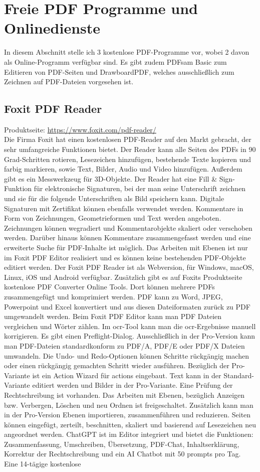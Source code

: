 \section{Freie PDF Programme und Onlinedienste}
In diesem Abschnitt stelle ich 3 kostenlose PDF-Programme vor, wobei 2 davon als Online-Programm verfügbar sind. Es gibt zudem PDFsam Basic zum Editieren von PDF-Seiten und DrawboardPDF, welches ausschließlich zum Zeichnen auf PDF-Dateien vorgesehen ist.

\subsection{Foxit PDF Reader}
Produktseite: \url{https://www.foxit.com/pdf-reader/} \\
Die Firma Foxit hat einen kostenlosen PDF-Reader auf den Markt gebracht, der sehr umfangreiche Funktionen bietet. Der Reader kann alle Seiten des PDFs in 90 Grad-Schritten rotieren, Lesezeichen hinzufügen, bestehende Texte kopieren und farbig markieren, sowie Text, Bilder, Audio und Video hinzufügen. Außerdem gibt es ein Messwerkzeug für 3D-Objekte. Der Reader hat eine Fill \& Sign-Funktion für elektronische Signaturen, bei der man seine Unterschrift zeichnen und sie für die folgende Unterschriften als Bild speichern kann. Digitale Signaturen mit Zertifikat können ebenfalls verwendet werden. Kommentare in Form von Zeichnungen, Geometrieformen und Text werden angeboten. Zeichnungen können wegradiert und Kommentarobjekte skaliert oder verschoben werden. Darüber hinaus können Kommentare zusammengefasst werden und eine erweiterte Suche für PDF-Inhalte ist möglich. Das Arbeiten mit Ebenen ist nur im Foxit PDF Editor realisiert und es können keine bestehenden PDF-Objekte editiert werden. Der Foxit PDF Reader ist als Webversion, für Windows, macOS, Linux, iOS und Android verfügbar. Zusätzlich gibt es auf Foxits Produktseite kostenlose PDF Converter Online Tools. Dort können mehrere PDFs zusammengefügt und komprimiert werden. PDF kann zu Word, JPEG, Powerpoint und Excel konvertiert und aus diesen Dateiformaten zurück zu PDF umgewandelt werden. Beim Foxit PDF Editor kann man PDF Dateien vergleichen und Wörter zählen. Im \gls{ocr}-Tool kann man die \gls{ocr}-Ergebnisse manuell korrigieren. Es gibt einen Preflight-Dialog. Ausschließlich in der Pro-Version kann man PDF-Dateien standardkonform zu PDF/A, PDF/E oder PDF/X Dateien umwandeln. Die Undo- und Redo-Optionen können Schritte rückgängig machen oder einen rückgängig gemachten Schritt wieder ausführen. Bezüglich der Pro-Variante ist ein Action Wizard für actions eingebaut. Text kann in der Standard-Variante editiert werden und Bilder in der Pro-Variante. Eine Prüfung der Rechtschreibung ist vorhanden. Das Arbeiten mit Ebenen, bezüglich Anzeigen bzw. Verbergen, Löschen und neu Ordnen ist freigeschaltet. Zusätzlich kann man in der Pro-Version Ebenen importieren, zusammenführen und reduzieren. Seiten können eingefügt, zerteilt, beschnitten, skaliert und basierend auf Lesezeichen neu angeordnet werden. ChatGPT ist im Editor integriert und bietet die Funktionen: Zusammenfassung, Umschreiben, Übersetzung, PDF-Chat, Inhaltserklärung, Korrektur der Rechtschreibung und ein AI Chatbot mit 50 prompts pro Tag. Eine 14-tägige kostenlose 